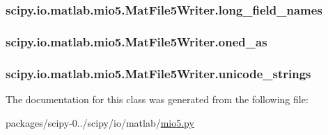 \subsubsection[{long\+\_\+field\+\_\+names}]{\setlength{\rightskip}{0pt plus 5cm}scipy.\+io.\+matlab.\+mio5.\+Mat\+File5\+Writer.\+long\+\_\+field\+\_\+names}\label{classscipy_1_1io_1_1matlab_1_1mio5_1_1MatFile5Writer_a8628ac038fd576a6b30ea524b5b6f752}
\hypertarget{classscipy_1_1io_1_1matlab_1_1mio5_1_1MatFile5Writer_abe758153347093df0054b93bb1f8559c}{}
\subsubsection[{oned\+\_\+as}]{\setlength{\rightskip}{0pt plus 5cm}scipy.\+io.\+matlab.\+mio5.\+Mat\+File5\+Writer.\+oned\+\_\+as}\label{classscipy_1_1io_1_1matlab_1_1mio5_1_1MatFile5Writer_abe758153347093df0054b93bb1f8559c}
\hypertarget{classscipy_1_1io_1_1matlab_1_1mio5_1_1MatFile5Writer_af9974a90073d52efd5fc08a535b976d9}{}
\subsubsection[{unicode\+\_\+strings}]{\setlength{\rightskip}{0pt plus 5cm}scipy.\+io.\+matlab.\+mio5.\+Mat\+File5\+Writer.\+unicode\+\_\+strings}\label{classscipy_1_1io_1_1matlab_1_1mio5_1_1MatFile5Writer_af9974a90073d52efd5fc08a535b976d9}


The documentation for this class was generated from the following file\+:\begin{DoxyCompactItemize}
\item 
packages/scipy-\/0../scipy/io/matlab/\hyperlink{mio5_8py}{mio5.\+py}\end{DoxyCompactItemize}
